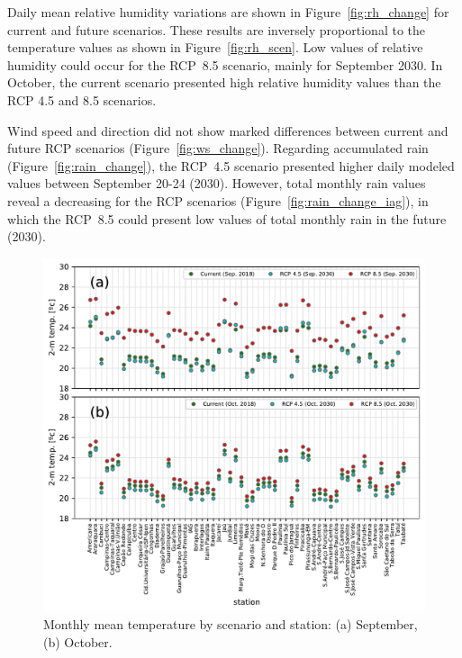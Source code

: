 Daily mean relative humidity variations are shown in Figure~\ref{fig:rh_change} for current and future scenarios.
These results are inversely proportional to the temperature values as shown in Figure~\ref{fig:rh_scen}.
Low values of relative humidity could occur for the RCP~8.5 scenario, mainly for September 2030.
In October, the current scenario presented high relative humidity values than the RCP 4.5 and 8.5 scenarios.

Wind speed and direction did not show marked differences between current and future RCP scenarios (Figure~\ref{fig:ws_change}).
Regarding accumulated rain (Figure~\ref{fig:rain_change}), the RCP~4.5 scenario presented higher daily modeled values between September 20-24 (2030).
However, total monthly rain values reveal a decreasing for the RCP scenarios (Figure~\ref{fig:rain_change_iag}), in which the RCP~8.5 could present low values of total monthly rain in the future (2030).

 \begin{figure}[hbt]
  \includegraphics[width=1\textwidth]{fig/temp_sep_oct.pdf}
  \caption{Monthly mean temperature by scenario and station: (a) September, (b) October.}
  \label{fig:temp_scen}
\end{figure}

